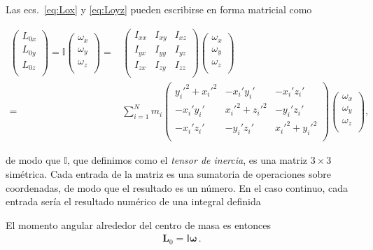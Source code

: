 Las ecs.~\eqref{eq:Lox} y \eqref{eq:Loyz} pueden escribirse en forma
matricial como
\begin{frame}
\begin{align}
  \begin{pmatrix}
    L_{0x}\\
    L_{0y}\\
    L_{0z}\\
  \end{pmatrix}=\mathbb{I}
  \begin{pmatrix}
    \omega_x\\
    \omega_y\\
    \omega_z\\
  \end{pmatrix}=&
  \begin{pmatrix}
    I_{xx}&I_{xy}&I_{xz}\\
    I_{yx}&I_{yy}&I_{yz}\\
    I_{zx}&I_{zy}&I_{zz}\\
  \end{pmatrix}
  \begin{pmatrix}
     \omega_x\\    
     \omega_y\\    
     \omega_z\\    
  \end{pmatrix}\nonumber\\
   =&
  \sum_{i=1}^Nm_i\begin{pmatrix}
    {y_i'}^2+{x_i'}^2&-x_i'y_i'        &-x_i'z_i'\\
    -x_i'y_i'       &{x_i'}^2+{z_i'}^2&-y_i'z_i'\\
    -x_i'z_i'       &-y_i'z_i'       &{x_i'}^2+{y_i'}^2\\
  \end{pmatrix}
  \begin{pmatrix}
     \omega_x\\    
     \omega_y\\    
     \omega_z\\    
  \end{pmatrix},
\end{align}
\end{frame}
de modo que $\mathbb{I}$, que definimos como el \emph{tensor de
  inercia}, es una matriz $3\times 3$ simétrica. 
Cada entrada de la matriz es una sumatoria de operaciones sobre
coordenadas, de modo que el resultado es un número.
En el caso continuo, cada entrada sería el resultado numérico de una
integral definida


El momento angular alrededor del centro de masa es entonces
\begin{align}
  \mathbf{L}_0=\mathbb{I}\boldsymbol{\omega}\,.
\end{align}


